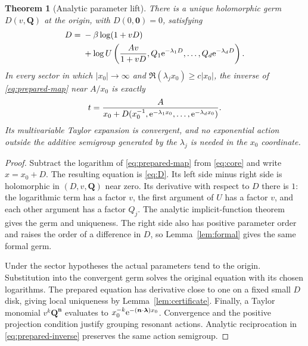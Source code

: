 \documentclass[11pt,a4paper]{article}
\numberwithin{equation}{section}
\newtheorem{theorem}{Theorem}[section]
\theoremstyle{definition}\newtheorem{definition}[theorem]{Definition}
\theoremstyle{remark}\newtheorem{remark}[theorem]{Remark}
\newcommand{\vct}[1]{\boldsymbol{#1}}
\begin{document}
\begin{theorem}[Analytic parameter lift]\label{thm:prepared}
There is a unique holomorphic germ $D(v,\vct Q)$ at the origin, with
$D(0,\vct0)=0$, satisfying
\begin{align}
 D={}&-\beta\log(1+vD)\notag\\
 &+\log U\left(\frac{Av}{1+vD},
 Q_1\mathrm e^{-\lambda_1D},\ldots,Q_d\mathrm e^{-\lambda_dD}\right).
 \label{eq:D}
\end{align}
In every sector in which $|x_0|\to\infty$ and
$\Re(\lambda_jx_0)\ge c|x_0|$, the inverse of
\eqref{eq:prepared-map} near $A/x_0$ is exactly
\begin{equation}\label{eq:prepared-inverse}
 t=\frac{A}{x_0+D(x_0^{-1},\mathrm e^{-\lambda_1x_0},\ldots,
 \mathrm e^{-\lambda_dx_0})}.
\end{equation}
Its multivariable Taylor expansion is convergent, and no exponential
action outside the additive semigroup generated by the $\lambda_j$
is needed in the $x_0$ coordinate.
\end{theorem}
\begin{proof}
Subtract the logarithm of \eqref{eq:prepared-map} from
\eqref{eq:core} and write $x=x_0+D$. The resulting equation is
\eqref{eq:D}. Its left side minus right side is holomorphic in
$(D,v,\vct Q)$ near zero. Its derivative with respect to $D$ there is
$1$: the logarithmic term has a factor $v$, the first argument of $U$
has a factor $v$, and each other argument has a factor $Q_j$.
The analytic implicit-function theorem gives the germ and uniqueness.
The right side also has positive parameter order and raises the order of
a difference in $D$, so Lemma~\ref{lem:formal} gives the same formal germ.

Under the sector hypotheses the actual parameters tend to the origin.
Substitution into the convergent germ solves the original equation with
its chosen logarithms. The prepared equation has derivative close to one
on a fixed small $D$ disk, giving local uniqueness by
Lemma~\ref{lem:certificate}. Finally, a Taylor monomial
$v^k\vct Q^{\vct n}$ evaluates to
$x_0^{-k}\e^{-(\vct n\cdot\vct\lambda)x_0}$.
Convergence and the positive projection condition justify grouping
resonant actions. Analytic reciprocation in \eqref{eq:prepared-inverse}
preserves the same action semigroup.
\end{proof}
\end{document}
